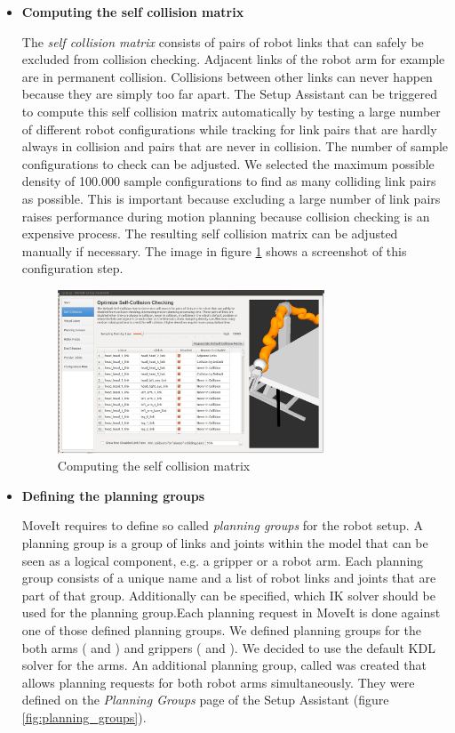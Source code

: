 \begin{itemize}

\item \textbf{Computing the self collision matrix}

The \emph{self collision matrix} consists of pairs of robot links that can safely be excluded from collision checking. Adjacent links of the robot arm for example are in permanent collision. Collisions between other links can never happen because they are simply too far apart. The Setup Assistant can be triggered to compute this self collision matrix automatically by testing a large number of different robot configurations while tracking for link pairs that are hardly always in collision and pairs that are never in collision. The number of sample configurations to check can be adjusted. We selected the maximum possible density of 100.000 sample configurations to find as many colliding link pairs as possible. This is important because excluding a large number of link pairs raises performance during motion planning because collision checking is an expensive process. The resulting self collision matrix can be adjusted manually if necessary. The image in figure \ref{fig:self_col} shows a screenshot of this configuration step.

\begin{figure}[p]
	\centering
  	\includegraphics[width=0.75\textwidth]{images/self_collision.jpg}
	\caption{Computing the self collision matrix}
	\label{fig:self_col}
\end{figure}

\item \textbf{Defining the planning groups}

MoveIt requires to define so called \emph{planning groups} for the robot setup. A planning group is a group of links and joints within the model that can be seen as a logical component, e.g. a gripper or a robot arm. Each planning group consists of a unique name and a list of robot links and joints that are part of that group. Additionally can be specified, which IK solver should be used for the planning group.Each planning request in MoveIt is done against one of those defined planning groups. We defined planning groups for the both arms ( and ) and grippers ( and ). We decided to use the default KDL solver for the arms. An additional planning group, called  was created that allows planning requests for both robot arms simultaneously. They were defined on the \emph{Planning Groups} page of the Setup Assistant (figure \ref{fig:planning_groups}).


\end{itemize}
